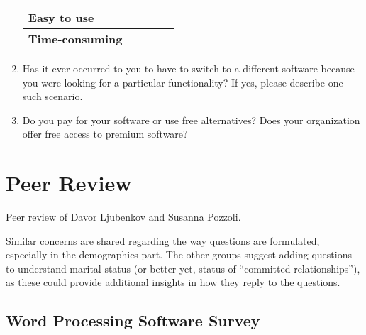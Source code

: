 \documentclass[a4paper,11pt]{article}
\begin{document}
\begin{enumerate}
\begin{table}[!h]
{\begin{tabular}{l|l|l|l|l|}
    \multicolumn{1}{|l|}{\textbf{Easy to use}}               &               &                                       &                &                      \\ \hline
    \multicolumn{1}{|l|}{\textbf{Time-consuming}}            &               &                                       &                &                      \\ \hline
    \end{tabular}%
    }
    \end{table}
    \item Has it ever occurred to you to have to switch to a different software because you were looking for a particular functionality? If yes, please describe one such scenario. 
    \item Do you pay for your software or use free alternatives? Does your organization offer free access to premium software?
\end{enumerate}

\clearpage
\section*{Peer Review}
Peer review of Davor Ljubenkov and Susanna Pozzoli.

\noindent Similar concerns are shared regarding the way questions are formulated, especially in the demographics part. The other groups suggest adding questions to understand marital status (or better yet, status of ``committed relationships''), as these could provide additional insights in how they reply to the questions.

\subsection*{Word Processing Software Survey}

\end{document}
